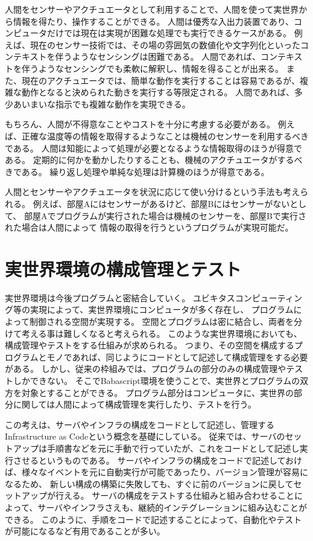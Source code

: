 人間をセンサーやアクチュエータとして利用することで、人間を使って実世界から情報を得たり、操作することができる。
人間は優秀な入出力装置であり、コンピュータだけでは現在は実現が困難な処理でも実行できるケースがある。
例えば、現在のセンサー技術では、その場の雰囲気の数値化や文字列化といったコンテキストを伴うようなセンシングは困難である。
人間であれば、コンテキストを伴うようなセンシングでも柔軟に解釈し、情報を得ることが出来る。
また、現在のアクチュエータでは、簡単な動作を実行することは容易であるが、複雑な動作となると決められた動きを実行する等限定される。
人間であれば、多少あいまいな指示でも複雑な動作を実現できる。

もちろん、人間が不得意なことやコストを十分に考慮する必要がある。
例えば、正確な温度等の情報を取得するようなことは機械のセンサーを利用するべきである。
人間は知能によって処理が必要となるような情報取得のほうが得意である。
定期的に何かを動かしたりすることも、機械のアクチュエータがするべきである。
繰り返し処理や単純な処理は計算機のほうが得意である。

人間とセンサーやアクチュエータを状況に応じて使い分けるという手法も考えられる。
例えば、部屋Aにはセンサーがあるけど、部屋Bにはセンサーがないとして、
部屋Aでプログラムが実行された場合は機械のセンサーを、部屋Bで実行された場合は人間によって
情報の取得を行うというプログラムが実現可能だ。

\section{実世界環境の構成管理とテスト}\label{ux5b9fux4e16ux754cux74b0ux5883ux306eux69cbux6210ux7ba1ux7406ux3068ux30c6ux30b9ux30c8}

実世界環境は今後プログラムと密結合していく。
ユビキタスコンピューティング等の実現によって、実世界環境にコンピュータが多く存在し、
プログラムによって制御される空間が実現する。
空間とプログラムは密に結合し、両者を分けて考える事は難しくなると考えられる。
このような実世界環境においても、構成管理やテストをする仕組みが求められる。
つまり、その空間を構成するプログラムとモノであれば、同じようにコードとして記述して構成管理をする必要がある。
しかし、従来の枠組みでは、プログラムの部分のみの構成管理やテストしかできない。
そこでBabascript環境を使うことで、実世界とプログラムの双方を対象とすることができる。
プログラム部分はコンピュータに、実世界の部分に関しては人間によって構成管理を実行したり、テストを行う。

この考えは、サーバやインフラの構成をコードとして記述し、管理するInfrastructure
as Codeという概念を基礎にしている。
従来では、サーバのセットアップは手順書などを元に手動で行っていたが、これをコードとして記述し実行させるというものである。
サーバやインフラの構成をコードで記述しておけば、様々なイベントを元に自動実行が可能であったり、バージョン管理が容易になるため、
新しい構成の構築に失敗しても、すぐに前のバージョンに戻してセットアップが行える。
サーバの構成をテストする仕組みと組み合わせることによって、サーバやインフラさえも、継続的インテグレーションに組み込むことができる。
このように、手順をコードで記述することによって、自動化やテストが可能になるなど有用であることが多い。

